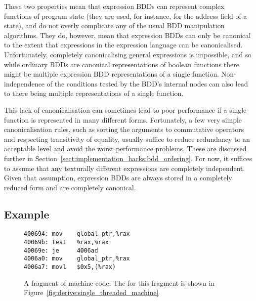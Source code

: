 These two properties mean that expression BDDs can represent complex
functions of program state (they are used, for instance, for the
address field of a  state), and do not overly complicate
any of the usual BDD manipulation algorithms.  They do, however, mean
that expression BDDs can only be canonical to the extent that
expressions in the expression language can be canonicalised.
Unfortunately, completely canonicalising general expressions is
impossible, and so while
ordinary BDDs are canonical representations of boolean functions there
might be multiple expression BDD representations of a single function.
Non-independence of the conditions tested by the BDD's internal nodes
can also lead to there being multiple representations of a single
function.

This lack of canonicalisation can sometimes lead to poor performance
if a single function is represented in many different forms.
Fortunately, a few very simple canonicalisation rules, such as sorting
the arguments to commutative operators and respecting transitivity of
equality, usually suffice to reduce redundancy to an acceptable level
and avoid the worst performance problems.  These are discussed further
in Section~\ref{sect:implementation_hacks:bdd_ordering}.  For now, it
suffices to assume that any texturally different expressions are
completely independent.  Given that assumption, expression BDDs are
always stored in a completely reduced form and are completely
canonical.

\subsection{Example}

\begin{figure}
\begin{verbatim}
400694: mov    global_ptr,%rax
40069b: test   %rax,%rax
40069e: je     4006ad
4006a0: mov    global_ptr,%rax
4006a7: movl   $0x5,(%rax)
\end{verbatim}
\caption{A fragment of machine code.  The {\StateMachine} for this
  fragment is shown in
  Figure~\ref{fig:derive:single_threaded_machine}}
\label{fig:derive:single_threaded_machine_inp}
\end{figure}

